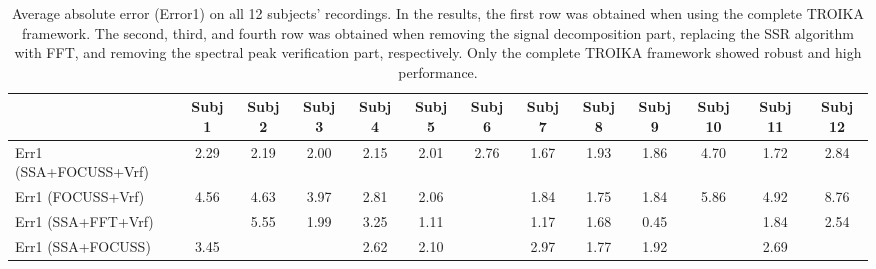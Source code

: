 \documentclass[10pt,twocolumn]{IEEEtran}
\begin{document}
\begin{table*}[t]
\renewcommand{\arraystretch}{1.2}
\caption{Average absolute error (Error1) on all 12 subjects' recordings. In the results, the first row was obtained when using the complete TROIKA framework. The second, third, and fourth row was obtained when removing the signal decomposition part, replacing the SSR algorithm with FFT, and removing the spectral peak verification part, respectively. Only the complete TROIKA framework showed robust and high performance.}
\label{table:err1}
\centering
\begin{tabular}{l|c|c|c|c|c|c|c|c|c|c|c|c}
\toprule
       &  Subj 1      & Subj 2   &  Subj 3   &  Subj 4   &Subj 5  &Subj  6  &Subj 7  &Subj  8  &Subj 9  &Subj 10 &Subj 11 & Subj 12\\
\midrule
Err1 (SSA+FOCUSS+Vrf)       &   2.29   &  2.19   &  2.00   &  2.15    & 2.01   &   2.76 & 1.67 & 1.93 & 1.86 & 4.70  & 1.72  & 2.84\\
\hline
Err1 (FOCUSS+Vrf)  &   4.56    & 4.63     & 3.97     & 2.81     & 2.06    & {\color{red}}   & 1.84  & 1.75  & 1.84  & 5.86   &  4.92  & 8.76  \\
\hline
Err1 (SSA+FFT+Vrf)       &   {\color{red}}   &  5.55   &  1.99   &  3.25    & 1.11   &  {\color{red}} & 1.17 & 1.68 & 0.45 & {\color{red}}  & 1.84  & 2.54 \\
\hline
Err1 (SSA+FOCUSS)       &   3.45   &  {\color{red}}   &  {\color{red}}   &  2.62    & 2.10   &  {\color{red}} & 2.97 & 1.77 & 1.92 & {\color{red}}  & 2.69  & {\color{red}} \\
\bottomrule
\end{tabular}
\end{table*}
\end{document}
